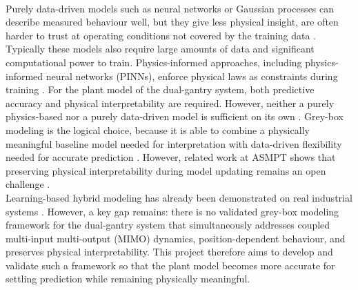 \\
Purely data-driven models such as neural networks or Gaussian processes can describe measured behaviour well, but they give less physical insight, are often harder to trust at operating conditions not covered by the training data \cite{willard2020integrating}. Typically these models also require large amounts of data and significant computational power to train. Physics-informed approaches, including physics-informed neural networks (PINNs), enforce physical laws as constraints during training \cite{karniadakis2021physicsinformed, raissi2017physicsinformedpart1}. For the plant model of the dual-gantry system, both predictive accuracy and physical interpretability are required. However, neither a purely physics-based nor a purely data-driven model is sufficient on its own \cite{willard2020integrating, noel2018greybox}. Grey-box modeling is the logical choice, because it is able to combine a physically meaningful baseline model needed for interpretation with data-driven flexibility needed for accurate prediction \cite{noel2018greybox}. However, related work at ASMPT shows that preserving physical interpretability during model updating remains an open challenge \cite{kessels2025ai}.
\\
Learning-based hybrid modeling has already been demonstrated on real industrial systems \cite{retzler2024}. However, a key gap remains: there is no validated grey-box modeling framework for the dual-gantry system that simultaneously addresses coupled multi-input multi-output (MIMO) dynamics, position-dependent behaviour, and preserves physical interpretability. This project therefore aims to develop and validate such a framework so that the plant model becomes more accurate for settling prediction while remaining physically meaningful.

